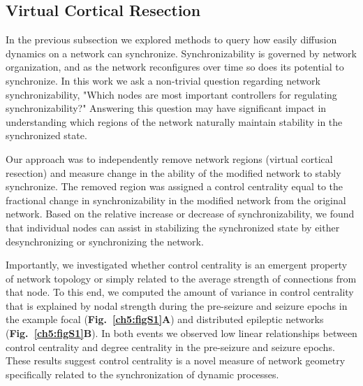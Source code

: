 \subsection{Virtual Cortical Resection}
In the previous subsection we explored methods to query how easily diffusion dynamics on a network can synchronize. Synchronizability is governed by network organization, and as the network reconfigures over time so does its potential to synchronize. In this work we ask a non-trivial question regarding network synchronizability, "Which nodes are most important controllers for regulating synchronizability?" Answering this question may have significant impact in understanding which regions of the network naturally maintain stability in the synchronized state.

Our approach was to independently remove network regions (virtual cortical resection) and measure change in the ability of the modified network to stably synchronize. The removed region was assigned a control centrality equal to the fractional change in synchronizability in the modified network from the original network. Based on the relative increase or decrease of synchronizability, we found that individual nodes can assist in stabilizing the synchronized state by either desynchronizing or synchronizing the network. 

Importantly, we investigated whether control centrality is an emergent property of network topology or simply related to the average strength of connections from that node. To this end, we computed the amount of variance in control centrality that is explained by nodal strength during the pre-seizure and seizure epochs in the example focal (\textbf{Fig.~\ref{ch5:figS1}A}) and distributed epileptic networks (\textbf{Fig.~\ref{ch5:figS1}B}). In both events we observed low linear relationships between control centrality and degree centrality in the pre-seizure and seizure epochs. These results suggest control centrality is a novel measure of network geometry specifically related to the synchronization of dynamic processes.   

